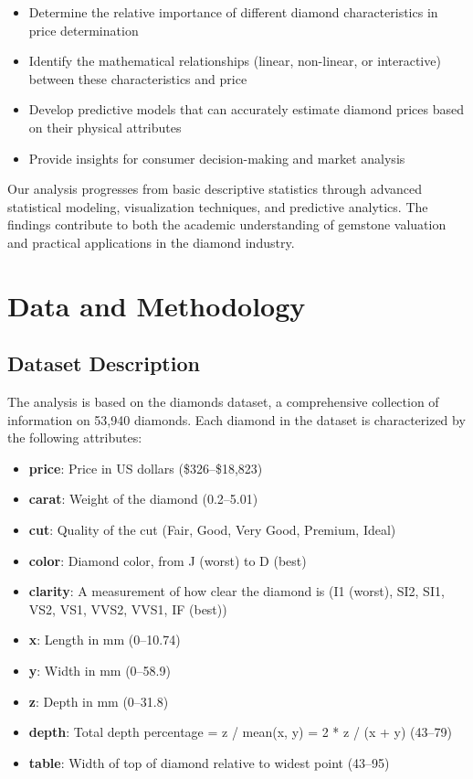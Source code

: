 \documentclass[11pt,a4paper]{article}
\begin{document}
\begin{itemize}
    \item Determine the relative importance of different diamond characteristics in price determination
    \item Identify the mathematical relationships (linear, non-linear, or interactive) between these characteristics and price
    \item Develop predictive models that can accurately estimate diamond prices based on their physical attributes
    \item Provide insights for consumer decision-making and market analysis
\end{itemize}

Our analysis progresses from basic descriptive statistics through advanced statistical modeling, visualization techniques, and predictive analytics. The findings contribute to both the academic understanding of gemstone valuation and practical applications in the diamond industry.

\section{Data and Methodology}

\subsection{Dataset Description}

The analysis is based on the diamonds dataset, a comprehensive collection of information on 53,940 diamonds. Each diamond in the dataset is characterized by the following attributes:

\begin{itemize}
    \item \textbf{price}: Price in US dollars (\$326--\$18,823)
    \item \textbf{carat}: Weight of the diamond (0.2--5.01)
    \item \textbf{cut}: Quality of the cut (Fair, Good, Very Good, Premium, Ideal)
    \item \textbf{color}: Diamond color, from J (worst) to D (best)
    \item \textbf{clarity}: A measurement of how clear the diamond is (I1 (worst), SI2, SI1, VS2, VS1, VVS2, VVS1, IF (best))
    \item \textbf{x}: Length in mm (0--10.74)
    \item \textbf{y}: Width in mm (0--58.9)
    \item \textbf{z}: Depth in mm (0--31.8)
    \item \textbf{depth}: Total depth percentage = z / mean(x, y) = 2 * z / (x + y) (43--79)
    \item \textbf{table}: Width of top of diamond relative to widest point (43--95)
\end{itemize}
\end{document}
